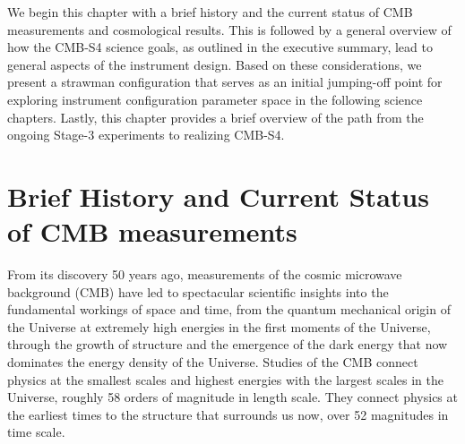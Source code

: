 
%

We begin this chapter with a brief history and the current status of CMB measurements and cosmological results.  This is followed by a general overview of how the CMB-S4 science goals, as outlined in the executive summary, lead to general aspects of the instrument design. Based on these considerations, we present a strawman configuration that serves as an initial jumping-off point for exploring instrument configuration parameter space in the following science chapters.  Lastly, this chapter provides a brief overview of the path from the ongoing Stage-3 experiments to realizing CMB-S4. 

\section{Brief History and Current Status of CMB measurements}
\label{sec:background}

From its discovery 50 years ago, measurements of the cosmic microwave background (CMB) have led to spectacular scientific insights into the fundamental workings of space and time, from the quantum mechanical origin of the Universe at extremely high energies in the first moments of the Universe, through the growth of structure and the emergence of the dark energy that now dominates the energy density of the Universe. Studies of the CMB connect physics at the smallest scales and highest energies with the largest scales in the Universe, roughly 58 orders of magnitude in length scale. They connect physics at the earliest times to the structure that surrounds us now, over 52 magnitudes in time scale. 

